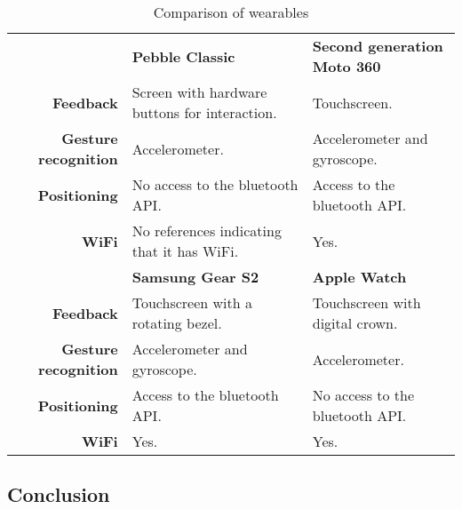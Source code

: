 \renewcommand{\arraystretch}{1.2}
\begin{table}[htb]
\centering
\caption{Comparison of wearables}
\label{tbl:analysis:choice-of-wearable}
\begin{tabularx}{\linewidth}{rXX}
\multicolumn{1}{l}{\textbf{}}     & \textbf{Pebble Classic}                       & \textbf{Second generation Moto 360} \\
\textbf{Feedback} & Screen with hardware buttons for interaction. & Touchscreen.                        \\
\textbf{Gesture recognition}      & Accelerometer. \cite{pebble:accelerometer}                                & Accelerometer and gyroscope. \cite{motorola:moto360} \cite{android:creating-wearable-apps} \cite{android:motion-sensors}        \\
\textbf{Positioning}              & No access to the bluetooth API.               & Access to the bluetooth API. \cite{motorola:moto360} \cite{android:creating-wearable-apps} \cite{android:bluetooth}        \\
\textbf{WiFi}                     & No references indicating that it has WiFi.    & Yes.                                \\
\multicolumn{1}{l}{}              & \textbf{Samsung Gear S2}                      & \textbf{Apple Watch}                \\
\textbf{Feedback} & Touchscreen with a rotating bezel.             & Touchscreen with digital crown.     \\
\textbf{Gesture recognition}      & Accelerometer and gyroscope. \cite{samsung:gears2} \cite{tizen:sensors}                  & Accelerometer.                      \\
\textbf{Positioning}              & Access to the bluetooth API. \cite{samsung:gears2} \cite{tizen:bluetooth}                  & No access to the bluetooth API.     \\
\textbf{WiFi}                     & Yes.                                          & Yes.                               
\end{tabularx}
\end{table}

\subsection{Conclusion}


